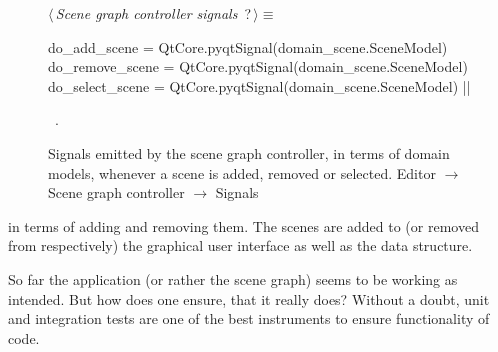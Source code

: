 \documentclass[%
    a4paper,    %
    justified,  %
    nobib,      %
    openany     %
]{tufte-book}
\begin{document}
\begin{figure}
\begin{flushleft} \small
\begin{minipage}{\linewidth}\label{scrap54}\raggedright\small
{} $\langle\,${\itshape Scene graph controller signals}\nobreak\ {\footnotesize {?}}$\,\rangle\equiv$
\vspace{-1ex}
\begin{pythoncode}
do_add_scene    = QtCore.pyqtSignal(domain_scene.SceneModel)
do_remove_scene = QtCore.pyqtSignal(domain_scene.SceneModel)
do_select_scene = QtCore.pyqtSignal(domain_scene.SceneModel)
|\NWsep|
\end{pythoncode}
\vspace{1.5ex}
\footnotesize
\begin{list}{}{\setlength{\itemsep}{-\parsep}\setlength{\itemindent}{-\leftmargin}}
\item \NWtxtMacroRefIn\ .

\item{}
\end{list}
\end{minipage}\vspace{4ex}
\end{flushleft}
\caption{Signals emitted by the scene graph controller, in terms of domain
  models, whenever a scene is added, removed or selected.
  \newline{}\newline{}Editor $\rightarrow$ Scene graph controller
  $\rightarrow$ Signals}
\label{editor:lst:scene-graph-controller:signals}
\end{figure}


 in terms of adding
and removing them. The scenes are added to (or removed from respectively) the
graphical user interface as well as the data structure.

So far the application (or rather the scene graph) seems to be working as
intended. But how does one ensure, that it really does? Without a doubt, unit
and integration tests are one of the best instruments to ensure functionality of
code.
\end{document}
